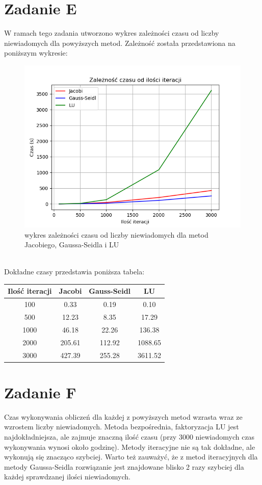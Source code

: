\documentclass{article} %
\begin{document}
\section{Zadanie E}
W ramach tego zadania utworzono wykres zależności czasu od liczby niewiadomych dla powyższych metod. Zależność została przedstawiona na poniższym wykresie: \\
\begin{figure}[h]
    \centering
    \includegraphics[scale=0.7]{wykres.png}
    \caption{ wykres zależności czasu od liczby niewiadomych dla metod Jacobiego, Gaussa-Seidla i LU}
\end{figure} \\
Dokładne czasy przedstawia poniższa tabela:
\begin{center} 
    \begin{tabular}  { | c | c | c | c |  }
        \hline
       Ilość iteracji & Jacobi & Gauss-Seidl & LU \\
       \hline
       100 & 0.33 & 0.19 & 0.10\\
       \hline
       500 & 12.23 & 8.35 & 17.29 \\
       \hline
       1000 & 46.18 & 22.26 & 136.38 \\
       \hline
       2000 & 205.61 & 112.92 & 1088.65 \\
       \hline
       3000 & 427.39 & 255.28 & 3611.52 \\
       \hline
    \end{tabular}
\end{center}
\section{Zadanie F}
Czas wykonywania obliczeń dla każdej z powyższych metod wzrasta wraz ze wzrostem liczby niewiadomych. Metoda bezpośrednia, faktoryzacja LU jest najdokładniejsza, ale zajmuje znaczną ilość czasu (przy 3000 niewiadomych czas wykonywania wynosi około godzinę). Metody iteracyjne nie są tak dokładne, ale wykonują się znacząco szybciej. Warto też zauważyć, że z metod iteracyjnych dla metody Gaussa-Seidla rozwiązanie jest znajdowane blisko 2 razy szybciej dla każdej sprawdzanej ilości niewiadomych.
\end{document}
